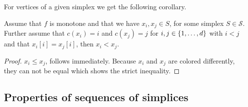 For vertices of a given simplex we get the following corollary.
\begin{corollary}
	\label{cor:monotone_coloring}
	Assume that $f$ is monotone and that we have $x_i, x_j \in S$, for some simplex $S\in  \mathcal{S}$. Further assume that $c(x_i) = i$ and $c(x_j) = j$ for $i, j \in \left\{1, \dots, d\right\}$ with $i < j$ and that $x_i[i] = x_j[i]$, then $x_i < x_j$.
\end{corollary}
\begin{proof}
	$x_i \leq x_j$, follows immediately. Because $x_i$ and $x_j$ are colored differently, they can not be equal which shows the strict inequality.
\end{proof}
\subsection{Properties of sequences of simplices}

